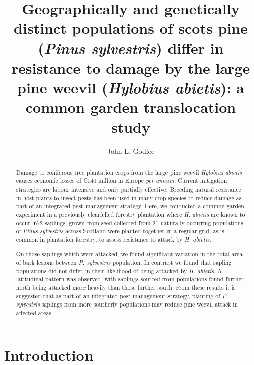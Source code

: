 \documentclass[a4paper, 11pt]{article}
\title{Geographically and genetically distinct populations of scots pine (\textit{Pinus sylvestris}) differ in resistance to damage by the large pine weevil (\textit{Hylobius abietis}): a common garden translocation study}
\author{John L. Godlee}
\begin{document}

\maketitle{}

\begin{abstract}

	Damage to coniferous tree plantation crops from the large pine weevil \textit{Hylobius abietis} causes economic losses of \euro{}140 million in Europe \textit{per annum}. Current mitigation strategies are labour intensive and only partially effective. Breeding natural resistance in host plants to insect pests has been used in many crop species to reduce damage as part of an integrated pest management strategy. Here, we conducted a common garden experiment in a previously clearfelled forestry plantation where \textit{H. abietis} are known to occur. 672 saplings, grown from seed collected from 21 naturally occurring populations of \textit{Pinus sylvestris} across Scotland were planted together in a regular grid, as is common in plantation forestry, to assess resistance to attack by \textit{H. abietis}.

	On those saplings which were attacked, we found significant variation in the total area of bark lesions between \textit{P. sylvestris} population. In contrast we found that sapling populations did not differ in their likelihood of being attacked by \textit{H. abietis}. A latitudinal pattern was observed, with saplings sourced from populations found further north being attacked more heavily than those further south. From these results it is suggested that as part of an integrated pest management strategy, planting of \textit{P. sylvestris} saplings from more southerly populations may reduce pine weevil attack in affected areas.



\end{abstract}

\section*{Introduction}
\end{document}
